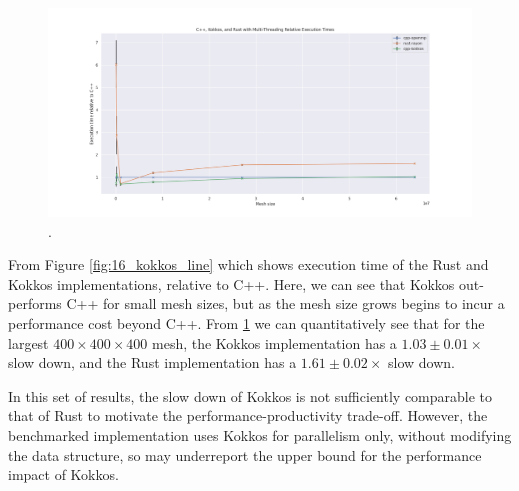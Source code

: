 \begin{figure}[H]
    \centering
    \includegraphics[width=\textwidth]{images/5_performance/parallelism/17_kokkos_line_relative.png}
    \caption{.}
    \label{fig:17_kokkos_line_relative}
\end{figure}


From Figure \ref{fig:16_kokkos_line} which shows execution time of the Rust and Kokkos implementations, relative to C++. Here, we can see that Kokkos out-performs C++ for small mesh sizes, but as the mesh size grows begins to incur a performance cost beyond C++. From \ref{fig:17_kokkos_line_relative} we can quantitatively see that for the largest $400 \times 400 \times 400$ mesh, the Kokkos implementation has a $1.03 \pm 0.01 \times$ slow down, and the Rust implementation has a $1.61 \pm 0.02 \times$ slow down. 

In this set of results, the slow down of Kokkos is not sufficiently comparable to that of Rust to motivate the performance-productivity trade-off. However, the benchmarked implementation uses Kokkos for parallelism only, without modifying the data structure, so may underreport the upper bound for the performance impact of Kokkos. %




